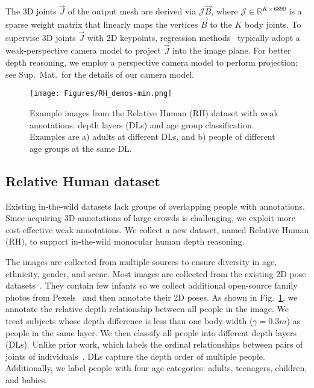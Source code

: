 \documentclass[10pt,twocolumn,letterpaper]{article}
\begin{document}
The 3D joints $\vec{J}$ of the output mesh are derived via $\mathcal{J}\vec{B}$, where $\mathcal{J} \in \mathbb{R}^{K \times 6890}$ is a sparse weight matrix that linearly maps the vertices $\vec{B}$ to the $K$ body joints.
To supervise 3D joints $\vec{J}$ with 2D keypoints, regression methods~\cite{hmr,romp} typically adopt a weak-perspective camera model to project $\vec{J}$ into the image plane. 
For better depth reasoning, we employ a perspective camera model to perform projection; see Sup.~Mat.~for the details of our camera model.

\begin{figure}[t]
	\centerline{\texttt{[image: Figures/RH\_demos-min.png]}}
	\vspace{-5mm}
	\caption{Example images from the Relative Human (RH) dataset with weak annotations: depth layers (DLs) and age group classification. Examples are a) adults at different DLs, and b) people of different age groups at the same DL.}
	\label{fig:RH_dmeos}\vspace{-3mm}
\end{figure}

\subsection{Relative Human dataset}
\label{sec:relative_human}
Existing in-the-wild datasets lack groups of overlapping people with annotations.
Since acquiring 3D annotations of large crowds is challenging, we exploit more cost-effective weak annotations. 
We collect a new dataset, named Relative Human (RH), to support in-the-wild monocular human depth reasoning.


The images are collected from multiple sources to ensure diversity in age, ethnicity, gender, and scene.
Most images are collected from the existing 2D pose datasets~\cite{coco,crowdpose,zhang2019pose2seg}. 
They contain few infants so we collect additional open-source family photos from Pexels~\cite{pexels} and then annotate their 2D poses.
As shown in Fig.~\ref{fig:RH_dmeos}, we annotate the relative depth relationship between all people in the image.
We treat subjects whose depth difference is less than one body-width ($\gamma=0.3m$) as people in the same layer.
We then classify all people into different depth layers (DLs).
Unlike prior work, which labels the ordinal relationships between pairs of joints of individuals~\cite{chen2016single}, DLs capture the depth order of multiple people.
Additionally, we label people with four age categories: adults, teenagers, children, and babies.
\end{document}
